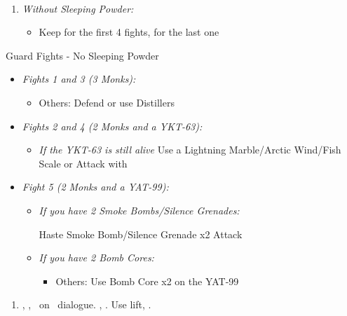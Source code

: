 \bothvfill
\lossvfill
\winvfill
\ 
\bothcb
\wincb
\losscb
\ 
\ \bothnewline \winnewline \lossnewline
\begin{enumerate}[resume]
	\item \textit{Without Sleeping Powder:}
		\begin{itemize}
			\item Keep \formation{\tidus}{\rikku}{\lulu} for the first 4 fights, \formation{\tidus}{\rikku}{\kimahri} for the last one
		\end{itemize}
\end{enumerate}
\begin{battle}{Guard Fights - No Sleeping Powder}
	\begin{itemize}
		\item \textit{Fights 1 and 3 (3 Monks):}
			\begin{itemize}
				\tidusf Attack
				\item Others: Defend or use Distillers
			\end{itemize}
		\item \textit{Fights 2 and 4 (2 Monks and a YKT-63):}
			\begin{itemize}
				\switch{\tidus}{\kimahri}
				\kimahrif Silence Grenade/Smoke Bomb
				\rikkuf Silence Grenade/Smoke Bomb
				\switch{\kimahri}{\tidus}
				\tidusf Attack the YKT-63
				\item \textit{If the YKT-63 is still alive} Use a Lightning Marble/Arctic Wind/Fish Scale or Attack with \tidus
			\end{itemize}
			\item \textit{Fight 5 (2 Monks and a YAT-99):}
			\begin{itemize}
				\item \textit{If you have 2 Smoke Bombs/Silence Grenades:}
					\begin{itemize}
						\tidusf Haste \rikku
						\rikkuf Smoke Bomb/Silence Grenade x2
						\tidusf Attack
					\end{itemize}
				\item \textit{If you have 2 Bomb Cores:}
					\begin{itemize}
						\tidusf Attack the Monks
						\item Others: Use Bomb Core x2 on the YAT-99
					\end{itemize}
			\end{itemize}
	\end{itemize}
\end{battle}
\begin{enumerate}[resume]
	\item \sd, \skippablefmv[1:30], \sd\ on \yuna\ dialogue. \skippablefmv[30], \sd. Use lift, \sd.
\end{enumerate}
